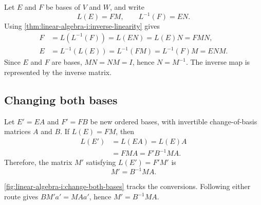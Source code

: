 

Let \(E\) and \(F\) be bases of \(V\) and \(W\), and write
\[
  L(E)=FM,\qquad L^{-1}(F)=EN.
\]
Using \autoref{thm:linear-algebra-i:inverse-linearity} gives
\[
  \begin{aligned}
    F&=L(L^{-1}(F))=L(EN)=L(E)N=FMN,\\
    E&=L^{-1}(L(E))=L^{-1}(FM)=L^{-1}(F)M=ENM.
  \end{aligned}
\]
Since \(E\) and \(F\) are bases, \(MN=NM=I\), hence \(N=M^{-1}\).
The inverse map is represented by the inverse matrix.




\subsection{Changing both bases}

Let \(E'=EA\) and \(F'=FB\) be new ordered bases, with invertible
change-of-basis matrices \(A\) and \(B\). If \(L(E)=FM\), then
\[
  \begin{aligned}
    L(E')&=L(EA)=L(E)A\\
      &=FMA=F'B^{-1}MA.
  \end{aligned}
\]
Therefore, the matrix \(M'\) satisfying \(L(E')=F'M'\) is
\begin{equation}
  M'=B^{-1}MA.
  \label{eq:linear-algebra-i:change-of-basis-for-maps}
\end{equation}

\autoref{fig:linear-algebra-i:change-both-bases} tracks the conversions.
Following either route gives \(BM'a'=MAa'\), hence
\(M'=B^{-1}MA\).
\begin{marginfigure}
  \centering
  
  \caption[Changing both coordinate systems]{The top row uses the new
    bases \(E',F'\). The bottom uses \(E,F\). The downward arrows convert
    new coordinates to old ones.}
  \label{fig:linear-algebra-i:change-both-bases}
\end{marginfigure}
